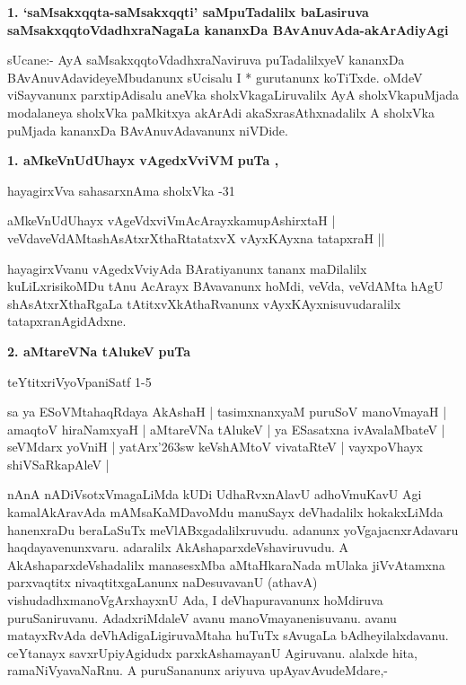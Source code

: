 \begin{center}
{\large {\bf 1. `saMsakxqqta-saMsakxqqti' saMpuTadalilx baLasiruva saMsakxqqtoVdadhxraNagaLa kananxDa BAvAnuvAda-akArAdiyAgi}}
\end{center}


sUcane:- AyA saMsakxqqtoVdadhxraNaviruva puTadalilxyeV kananxDa BAvAnu\-vAdavideyeMbudanunx sUci\-salu I * gurutanunx koTiTxde. oMdeV viSayvanunx parxtipAdisalu aneVka sholxVkagaLiruvalilx AyA sholxVkapuM\-jada modalaneya sholxVka paMkitxya akArAdi akaSxrasAthxnadalilx A sholxVka puMjada kananxDa BAvA\-nuvAdavanunx niVDide.

\medskip
\noindent
\textbf{1. aMkeVnUdUhayx vAgedxVviVM} \hfill{\bf puTa \pageref{page64},\pageref{page84}}

\hfill{hayagirxVva sahasarxnAma sholxVka -31}

\smallskip
\begin{shloka}
aMkeVnUdUhayx vAgeVdxviVmAcArayxkamupAshirxtaH |\\
veVdaveVdAMtashAsAtxrXthaRtatatxvX	vAyxKAyxna tatapxraH ||
\end{shloka}

hayagirxVvanu vAgedxVviyAda BAratiyanunx tananx maDilalilx kuLiLxrisikoMDu tAnu AcArayx BAvavanunx hoMdi, veVda, veVdAMta hAgU shAsAtxrXthaRgaLa tAtitxvXkAthaR\-vanunx vAyxKAyxnisuvudaralilx tatapxranAgidAdxne.

\medskip
\noindent
\textbf{2. aMtareVNa tAlukeV} \hfill{\bf puTa \pageref{page124}}

\hfill{teYtitxriVyoVpaniSatf 1-5}

\smallskip
sa ya ESoVMtahaqRdaya AkAshaH | tasimxnanxyaM puruSoV manoVmayaH | amaqtoV hiraNamxyaH | aMtareVNa tAlukeV | ya ESasatxna ivAvalaMbateV | seVMdarx yoVniH | yatArx\char'263sw keVshAMtoV vivataRteV | vayxpoVhayx shiVSaRkapAleV |

nAnA nADiVsotxVmagaLiMda kUDi UdhaRvxnAlavU adhoVmuKavU Agi kamalAkAravAda mAMsa\-KaMDavoMdu manuSayx deVhadalilx hokakxLiMda hanenxraDu beraLaSuTx meVlABxgadalilxruvudu. adanunx yoVga\-jacnxrAdavaru haqdayavenunxvaru. adaralilx AkAshaparxdeVshaviruvudu. A AkAshaparxdeVshadalilx manasesxMba aMtaH\-karaNada mUlaka jiVvAtamxna parxvaqtitx nivaqtitxgaLanunx naDesuvavanU (athavA) vishudadhxmanoV\-gArxhayxnU Ada, I deVhapuravanunx hoMdiruva puruSaniruvanu. AdadxriMdaleV avanu manoVmayanenisuvanu. ava\-nu matayxRvAda deVhAdigaLigiruvaMtaha huTuTx sAvugaLa bAdheyilalxdavanu. ceYtanayx savxrUpiyAgidudx parxkAsha\-mayanU Agiruvanu. alalxde hita, ramaNiVyavaNaRnu. A puruSananunx ariyuva upAya\-vAvudeMdare,-

